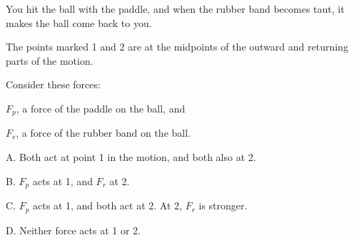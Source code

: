 \begin{qu}
\num{} You hit the ball with the paddle,
and when the rubber band becomes taut, it makes the ball come back to you.

\noindent The points marked 1 and 2 are at the midpoints of the
outward and returning parts of the motion.

\noindent Consider these forces:

$F_p$, a force of the paddle on the ball, and

$F_r$, a force of the rubber band on the ball.


\noindent A. Both act at point 1 in the motion, and both also at 2.

\noindent B. $F_p$ acts at 1, and $F_r$ at 2.

\noindent C. $F_p$ acts at 1, and both act at 2. At 2, $F_r$ is stronger.

\noindent D. Neither force acts at 1 or 2.

\end{qu}

